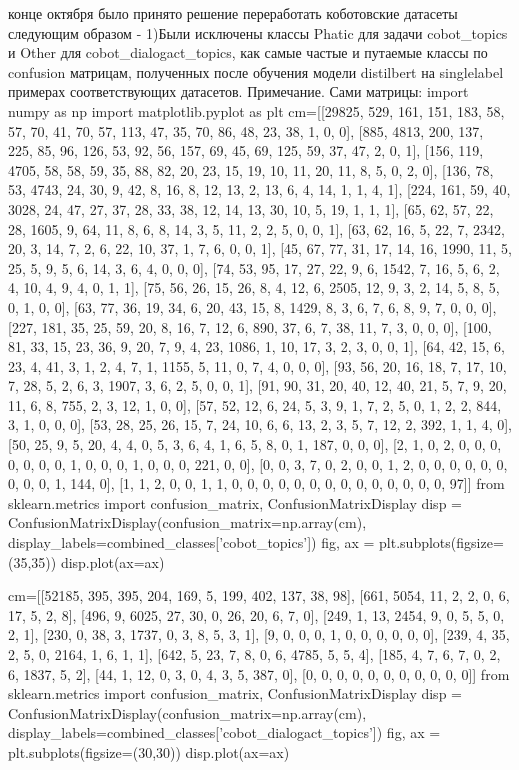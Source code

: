  конце октября было принято решение переработать коботовские датасеты следующим образом - 
1)Были исключены классы Phatic для задачи cobot_topics и Other для cobot_dialogact_topics, как самые частые и путаемые классы по confusion матрицам, полученных после обучения модели distilbert на singlelabel примерах соответствующих датасетов.
Примечание. Сами матрицы: import numpy as np
import matplotlib.pyplot as plt
cm=[[29825, 529, 161, 151, 183, 58, 57, 70, 41, 70, 57, 113, 47, 35, 70, 86, 48, 23, 38, 1, 0, 0], [885, 4813, 200, 137, 225, 85, 96, 126, 53, 92, 56, 157, 69, 45, 69, 125, 59, 37, 47, 2, 0, 1], [156, 119, 4705, 58, 58, 59, 35, 88, 82, 20, 23, 15, 19, 10, 11, 20, 11, 8, 5, 0, 2, 0], [136, 78, 53, 4743, 24, 30, 9, 42, 8, 16, 8, 12, 13, 2, 13, 6, 4, 14, 1, 1, 4, 1], [224, 161, 59, 40, 3028, 24, 47, 27, 37, 28, 33, 38, 12, 14, 13, 30, 10, 5, 19, 1, 1, 1], [65, 62, 57, 22, 28, 1605, 9, 64, 11, 8, 6, 8, 14, 3, 5, 11, 2, 2, 5, 0, 0, 1], [63, 62, 16, 5, 22, 7, 2342, 20, 3, 14, 7, 2, 6, 22, 10, 37, 1, 7, 6, 0, 0, 1], [45, 67, 77, 31, 17, 14, 16, 1990, 11, 5, 25, 5, 9, 5, 6, 14, 3, 6, 4, 0, 0, 0], [74, 53, 95, 17, 27, 22, 9, 6, 1542, 7, 16, 5, 6, 2, 4, 10, 4, 9, 4, 0, 1, 1], [75, 56, 26, 15, 26, 8, 4, 12, 6, 2505, 12, 9, 3, 2, 14, 5, 8, 5, 0, 1, 0, 0], [63, 77, 36, 19, 34, 6, 20, 43, 15, 8, 1429, 8, 3, 6, 7, 6, 8, 9, 7, 0, 0, 0], [227, 181, 35, 25, 59, 20, 8, 16, 7, 12, 6, 890, 37, 6, 7, 38, 11, 7, 3, 0, 0, 0], [100, 81, 33, 15, 23, 36, 9, 20, 7, 9, 4, 23, 1086, 1, 10, 17, 3, 2, 3, 0, 0, 1], [64, 42, 15, 6, 23, 4, 41, 3, 1, 2, 4, 7, 1, 1155, 5, 11, 0, 7, 4, 0, 0, 0], [93, 56, 20, 16, 18, 7, 17, 10, 7, 28, 5, 2, 6, 3, 1907, 3, 6, 2, 5, 0, 0, 1], [91, 90, 31, 20, 40, 12, 40, 21, 5, 7, 9, 20, 11, 6, 8, 755, 2, 3, 12, 1, 0, 0], [57, 52, 12, 6, 24, 5, 3, 9, 1, 7, 2, 5, 0, 1, 2, 2, 844, 3, 1, 0, 0, 0], [53, 28, 25, 26, 15, 7, 24, 10, 6, 6, 13, 2, 3, 5, 7, 12, 2, 392, 1, 1, 4, 0], [50, 25, 9, 5, 20, 4, 4, 0, 5, 3, 6, 4, 1, 6, 5, 8, 0, 1, 187, 0, 0, 0], [2, 1, 0, 2, 0, 0, 0, 0, 0, 0, 0, 1, 0, 0, 0, 1, 0, 0, 0, 221, 0, 0], [0, 0, 3, 7, 0, 2, 0, 0, 1, 2, 0, 0, 0, 0, 0, 0, 0, 0, 0, 1, 144, 0], [1, 1, 2, 0, 0, 1, 1, 0, 0, 0, 0, 0, 0, 0, 0, 0, 0, 0, 0, 0, 0, 97]]
from sklearn.metrics import confusion_matrix, ConfusionMatrixDisplay
disp = ConfusionMatrixDisplay(confusion_matrix=np.array(cm), display_labels=combined_classes['cobot_topics'])
fig, ax = plt.subplots(figsize=(35,35))
disp.plot(ax=ax)


cm=[[52185, 395, 395, 204, 169, 5, 199, 402, 137, 38, 98], [661, 5054, 11, 2, 2, 0, 6, 17, 5, 2, 8], [496, 9, 6025, 27, 30, 0, 26, 20, 6, 7, 0], [249, 1, 13, 2454, 9, 0, 5, 5, 0, 2, 1], [230, 0, 38, 3, 1737, 0, 3, 8, 5, 3, 1], [9, 0, 0, 0, 1, 0, 0, 0, 0, 0, 0], [239, 4, 35, 2, 5, 0, 2164, 1, 6, 1, 1], [642, 5, 23, 7, 8, 0, 6, 4785, 5, 5, 4], [185, 4, 7, 6, 7, 0, 2, 6, 1837, 5, 2], [44, 1, 12, 0, 3, 0, 4, 3, 5, 387, 0], [0, 0, 0, 0, 0, 0, 0, 0, 0, 0, 0]]
from sklearn.metrics import confusion_matrix, ConfusionMatrixDisplay
disp = ConfusionMatrixDisplay(confusion_matrix=np.array(cm), display_labels=combined_classes['cobot_dialogact_topics'])
fig, ax = plt.subplots(figsize=(30,30))
disp.plot(ax=ax)


